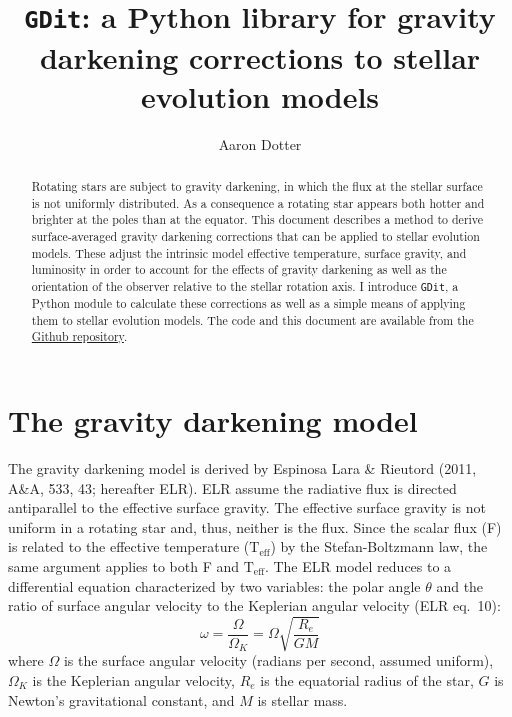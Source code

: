 \documentclass[12pt]{article}
\newcommand{\Teff}{\mathrm{T_{eff}}}
\begin{document}
\title{\texttt{GDit}: a Python library for gravity darkening corrections to stellar evolution models}
\author{Aaron Dotter}

\maketitle

\begin{abstract}
Rotating stars are subject to gravity darkening, in which the flux
at the stellar surface is not uniformly distributed. As a consequence
a rotating star appears both hotter and brighter at the poles than
at the equator. This document describes a method to derive surface-averaged
gravity darkening corrections that can be applied to stellar evolution models.
These adjust the intrinsic model effective temperature, surface gravity, and
luminosity in order to account for the effects of gravity darkening as well as
the orientation of the observer relative to the stellar rotation axis. I introduce
\texttt{GDit}, a Python module to calculate these corrections as well as a
simple means of applying them to stellar evolution models. The code and this document
are available from the \href{https://github.com/aarondotter/GDit}{Github repository}. \faGithub
\end{abstract}


\section{The gravity darkening model}
The gravity darkening model is derived by Espinosa Lara \& Rieutord (2011,
A\&A, 533, 43; hereafter ELR). ELR assume the radiative flux is directed
antiparallel to the effective surface gravity. The effective surface gravity
is not uniform in a rotating star and, thus, neither is the flux. Since the
scalar flux (F) is related to the effective temperature ($\Teff$) by the
Stefan-Boltzmann law, the same
argument applies to both F and $\Teff$. The ELR model reduces to a differential
equation characterized by two variables: the polar angle $\theta$ and the ratio
of surface angular velocity to the Keplerian angular velocity (ELR eq.\ 10):
\begin{equation}
  \omega = \frac{\Omega}{\Omega_K} = \Omega \sqrt{ \frac{R_e}{GM} }
\end{equation}
where $\Omega$ is the surface angular velocity (radians per second,
assumed uniform), $\Omega_K$ is the Keplerian angular velocity,
$R_e$ is the equatorial radius of the star, $G$ is Newton's gravitational constant,
and $M$ is stellar mass. 
\end{document}
